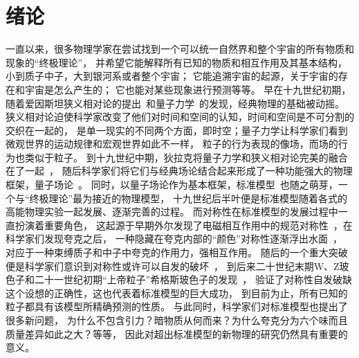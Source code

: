 
\chapter{绪论}
\label{cha:intro}

一直以来，很多物理学家在尝试找到一个可以统一自然界和整个宇宙的所有物质和现象的“终极理论”，
并希望它能解释所有已知的物质和相互作用及其基本结构，小到质子中子，大到银河系或者整个宇宙；
它能追溯宇宙的起源，关于宇宙的存在和宇宙是怎么产生的；
它也能对某些现象进行预测等等。
早在十九世纪初期，随着爱因斯坦狭义相对论的提出~\cite{SRE}和量子力学~\cite{QMP}的发现，经典物理的基础被动摇。
狭义相对论迫使科学家改变了他们对时间和空间的认知，时间和空间是不可分割的交织在一起的，
是单一现实的不同两个方面，即时空；量子力学让科学家们看到微观世界的运动规律和宏观世界如此不一样，
粒子的行为表现的像场，而场的行为也类似于粒子。
到十九世纪中期，狄拉克将量子力学和狭义相对论完美的融合在了一起~\cite{QMP}，
随后科学家们将它们与经典场论结合起来形成了一种功能强大的物理框架，量子场论~\cite{QFT1}。
同时，以量子场论作为基本框架，标准模型~\cite{SM2}也随之萌芽，一个与“终极理论”最为接近的物理模型，
十九世纪后半叶便是标准模型随着各式的高能物理实验一起发展、逐渐完善的过程。
而对称性在标准模型的发展过程中一直扮演着重要角色，
这起源于早期外尔发现了电磁相互作用中的规范对称性~\cite{WEYL}，在科学家们发现夸克之后，
一种隐藏在夸克内部的“颜色”对称性逐渐浮出水面~\cite{SM0}，
对应于一种束缚质子和中子中夸克的作用力，强相互作用。
随后的一个重大突破便是科学家们意识到对称性或许可以自发的破坏~\cite{SM4,SM5,SM6}，
到后来二十世纪末期W、Z玻色子和二十一世纪初期“上帝粒子”希格斯玻色子的发现~\cite{ZBOSON,WBOSON1,WBOSON2,ATLASHIGGS,CMSHIGGS}，
验证了对称性自发破缺这个设想的正确性，这也代表着标准模型的巨大成功，
到目前为止，所有已知的粒子都具有该模型所精确预测的性质。
与此同时，科学家们对标准模型也提出了很多新问题，
为什么不包含引力？暗物质从何而来？为什么夸克分为六个味而且质量差异如此之大？等等，
因此对超出标准模型的新物理的研究仍然具有重要的意义。

